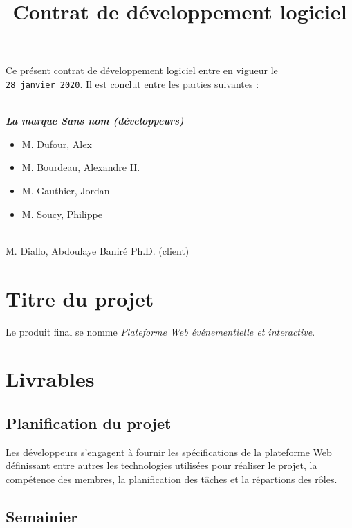 \documentclass[letter,12pt]{exam}
\title{Contrat de développement logiciel\\}
\date{}
\begin{document}
\maketitle

Ce présent contrat de développement logiciel entre en vigueur le
\texttt{28\ janvier\ 2020}. Il est conclut entre les parties suivantes :

\vspace{0.5cm}
\\
\large\textbf{\emph{La marque Sans nom (développeurs)}}

\begin{itemize}
\item[]  M. Dufour, Alex
\item[]  M. Bourdeau, Alexandre H.
\item[]  M. Gauthier, Jordan
\item[]  M. Soucy, Philippe
\end{itemize}

\vspace{0.5cm}
\\

M. Diallo, Abdoulaye Baniré
Ph.D. (client)


\section{Titre du projet}

Le produit final se nomme \emph{Plateforme Web événementielle et interactive}.


\section{Livrables}

\subsection{Planification du projet}

Les développeurs s'engagent à fournir les spécifications de la
plateforme Web définissant entre autres les technologies utilisées pour
réaliser le projet, la compétence des membres, la planification des
tâches et la répartions des rôles.

\subsection{Semainier}
\end{document}
